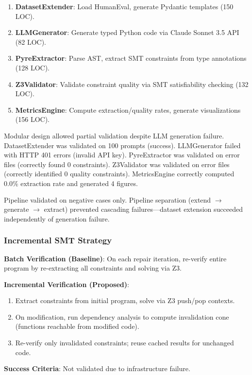 \begin{enumerate}
\item \textbf{DatasetExtender}: Load HumanEval, generate Pydantic templates (150 LOC).
\item \textbf{LLMGenerator}: Generate typed Python code via Claude Sonnet 3.5 API (82 LOC).
\item \textbf{PyreExtractor}: Parse AST, extract SMT constraints from type annotations (128 LOC).
\item \textbf{Z3Validator}: Validate constraint quality via SMT satisfiability checking (132 LOC).
\item \textbf{MetricsEngine}: Compute extraction/quality rates, generate visualizations (156 LOC).
\end{enumerate}

Modular design allowed partial validation despite LLM generation failure. DatasetExtender was validated on 100 prompts (success). LLMGenerator failed with HTTP 401 errors (invalid API key). PyreExtractor was validated on error files (correctly found 0 constraints). Z3Validator was validated on error files (correctly identified 0 quality constraints). MetricsEngine correctly computed 0.0\% extraction rate and generated 4 figures.

Pipeline validated on negative cases only. Pipeline separation (extend $\rightarrow$ generate $\rightarrow$ extract) prevented cascading failures---dataset extension succeeded independently of generation failure.

\subsubsection{Incremental SMT Strategy}

\textbf{Batch Verification (Baseline)}: On each repair iteration, re-verify entire program by re-extracting all constraints and solving via Z3.

\textbf{Incremental Verification (Proposed)}:
\begin{enumerate}
\item Extract constraints from initial program, solve via Z3 push/pop contexts.
\item On modification, run dependency analysis to compute invalidation cone (functions reachable from modified code).
\item Re-verify only invalidated constraints; reuse cached results for unchanged code.
\end{enumerate}

\textbf{Success Criteria}: Not validated due to infrastructure failure.

